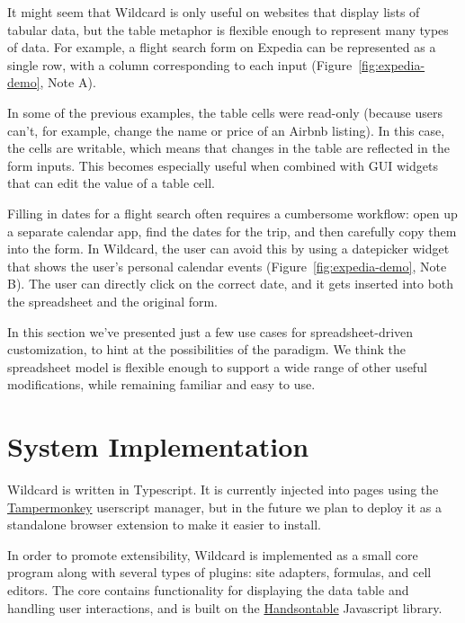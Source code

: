 \documentclass[english,submission]{programming}
\begin{document}
It might seem that Wildcard is only useful on websites that display
lists of tabular data, but the table metaphor is flexible enough to
represent many types of data. For example, a flight search form on
Expedia can be represented as a single row, with a column corresponding
to each input{ (Figure~\ref{fig:expedia-demo}, Note A)}.

In some of the previous examples, the table cells were read-only
(because users can't, for example, change the name or price of an Airbnb
listing). In this case, the cells are writable, which means that changes
in the table are reflected in the form inputs. This becomes especially
useful when combined with GUI widgets that can edit the value of a table
cell.

Filling in dates for a flight search often requires a cumbersome
workflow: open up a separate calendar app, find the dates for the trip,
and then carefully copy them into the form. In Wildcard, the user can
avoid this by using a datepicker widget that shows the user's personal
calendar events{ (Figure~\ref{fig:expedia-demo}, Note B)}. The user can
directly click on the correct date, and it gets inserted into both the
spreadsheet and the original form.

In this section we've presented just a few use cases for
spreadsheet-driven customization, to hint at the possibilities of the
paradigm. We think the spreadsheet model is flexible enough to support a
wide range of other useful modifications, while remaining familiar and
easy to use.

\hypertarget{sec:implementation}{%
\section{System Implementation}\label{sec:implementation}}

Wildcard is written in Typescript. It is currently injected into pages
using the \href{https://www.tampermonkey.net/}{Tampermonkey} userscript
manager, but in the future we plan to deploy it as a standalone browser
extension to make it easier to install.

In order to promote extensibility, Wildcard is implemented as a small
core program along with several types of plugins: site adapters,
formulas, and cell editors. The core contains functionality for
displaying the data table and handling user interactions, and is built
on the \href{https://handsontable.com/}{Handsontable} Javascript
library.
\end{document}
